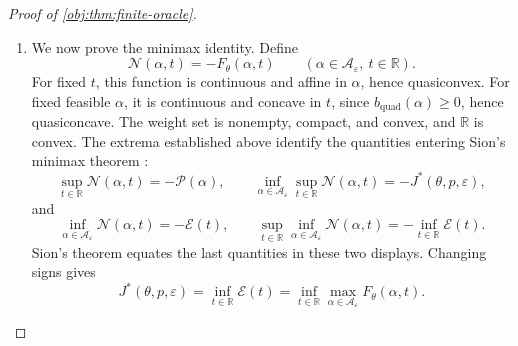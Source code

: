 \begin{proof}[Proof of \cref{obj:thm:finite-oracle}]
\begin{enumerate}
For the first singleton pattern,
\[
g_{\{x_0\}}
=
\begin{pmatrix}-(e^\varepsilon-1)(1-p)\\0\end{pmatrix}.
\]
Define the positive envelope coefficient
\[
\eta_{\mathrm{env}}
=
\frac{(e^\varepsilon-1)^2(1-p)^2}
{(e^\varepsilon+1)h_{\{x_0\}}(\theta)}>0.
\]
Nonnegativity of every summand yields
\[
\eta_{\mathrm{env}}t^2
\le F_\theta(\alpha_{\mathrm{pair}},t)
\le\mathscr E(t)
\qquad(t\in\mathbb R).
\]
Hence the sublevel set at \(\mathscr E(0)\) satisfies
\[
\{t\in\mathbb R:\mathscr E(t)\le\mathscr E(0)\}
\subseteq
\left[
-\sqrt{\frac{\mathscr E(0)}{\eta_{\mathrm{env}}}},
\sqrt{\frac{\mathscr E(0)}{\eta_{\mathrm{env}}}}
\right].
\]
It is nonempty and closed, and therefore compact. Minimizing on
this set gives a coordinate \(t_{\mathrm{env}}\in\mathbb R\) with
\[
\mathscr E(t_{\mathrm{env}})
\le\mathscr E(t)
\qquad(t\in\mathbb R).
\]

\item We now prove the minimax identity. Define
\[
\mathscr N(\alpha,t)=-F_\theta(\alpha,t)
\qquad
(\alpha\in\mathcal A_\varepsilon,\ t\in\mathbb R).
\]
For fixed \(t\), this function is continuous and affine in
\(\alpha\), hence quasiconvex. For fixed feasible \(\alpha\), it is
continuous and concave in \(t\), since
\(b_{\mathrm{quad}}(\alpha)\ge0\), hence quasiconcave. The weight
set is nonempty, compact, and convex, and \(\mathbb R\) is convex.
The extrema established above identify the quantities entering
Sion's minimax theorem \citep{Sion1958}:
\[
\sup_{t\in\mathbb R}\mathscr N(\alpha,t)=-\mathscr P(\alpha),
\qquad
\inf_{\alpha\in\mathcal A_\varepsilon}
\sup_{t\in\mathbb R}\mathscr N(\alpha,t)
=-J^*(\theta,p,\varepsilon),
\]
and
\[
\inf_{\alpha\in\mathcal A_\varepsilon}\mathscr N(\alpha,t)
=-\mathscr E(t),
\qquad
\sup_{t\in\mathbb R}
\inf_{\alpha\in\mathcal A_\varepsilon}\mathscr N(\alpha,t)
=-\inf_{t\in\mathbb R}\mathscr E(t).
\]
Sion's theorem equates the last quantities in these two displays.
Changing signs gives
\[
J^*(\theta,p,\varepsilon)
=
\inf_{t\in\mathbb R}\mathscr E(t)
=
\inf_{t\in\mathbb R}
\max_{\alpha\in\mathcal A_\varepsilon}F_\theta(\alpha,t).
\]


\end{enumerate}
\end{proof}
